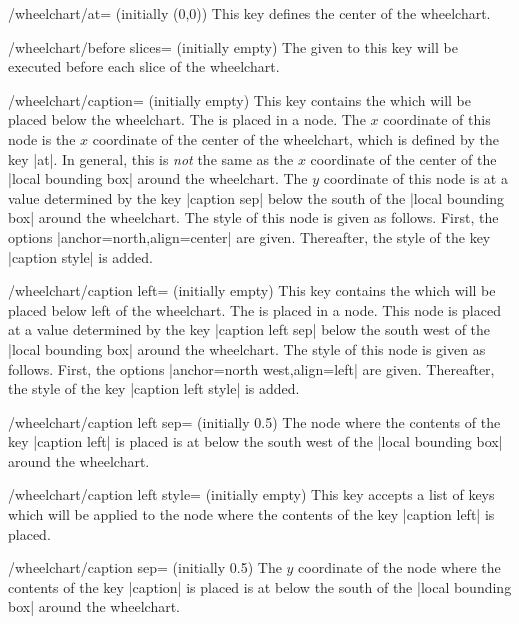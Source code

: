 \documentclass[a4paper,english,dvipsnames]{ltxdoc}
\begin{document}
\begin{key}{/wheelchart/at= (initially (0,0))}
This key defines the center of the wheelchart.
\end{key}
\begin{key}{/wheelchart/before slices= (initially \normalfont empty)}
The  given to this key will be executed before each slice of the wheelchart.
\end{key}
\begin{key}{/wheelchart/caption= (initially \normalfont empty)}
This key contains the  which will be placed below the wheelchart. The  is placed in a node. The $x$ coordinate of this node is the $x$ coordinate of the center of the wheelchart, which is defined by the key |at|. In general, this is \emph{not} the same as the $x$ coordinate of the center of the |local bounding box| around the wheelchart. The $y$ coordinate of this node is at a value determined by the key |caption sep| below the south of the |local bounding box| around the wheelchart. The style of this node is given as follows. First, the options |anchor=north,align=center| are given. Thereafter, the style of the key |caption style| is added.
\end{key}
\begin{key}{/wheelchart/caption left= (initially \normalfont empty)}
This key contains the  which will be placed below left of the wheelchart. The  is placed in a node. This node is placed at a value determined by the key |caption left sep| below the south west of the |local bounding box| around the wheelchart. The style of this node is given as follows. First, the options |anchor=north west,align=left| are given. Thereafter, the style of the key |caption left style| is added.
\end{key}
\begin{key}{/wheelchart/caption left sep= (initially 0.5)}
The node where the contents of the key |caption left| is placed is at  below the south west of the |local bounding box| around the wheelchart.
\end{key}
\begin{stylekey}{/wheelchart/caption left style= (initially \normalfont empty)}
This key accepts a list of keys which will be applied to the node where the contents of the key |caption left| is placed.
\end{stylekey}
\begin{key}{/wheelchart/caption sep= (initially 0.5)}
The $y$ coordinate of the node where the contents of the key |caption| is placed is at  below the south of the |local bounding box| around the wheelchart.
\end{key}
\end{document}
